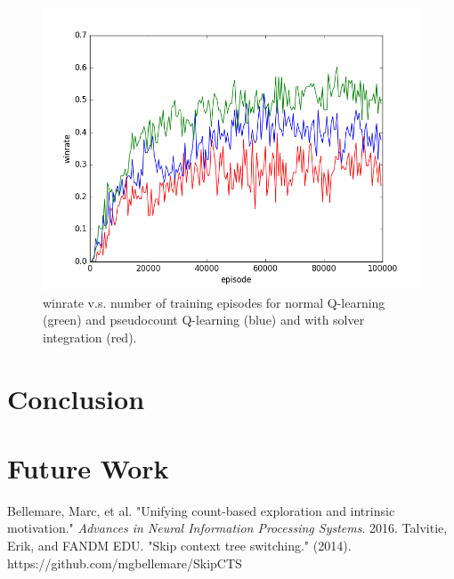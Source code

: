 \documentclass{article}
\begin{document}
\begin{figure}[!ht]
\centering
\includegraphics[width=1\textwidth]{pics/wolve_learning_curves.png}
\caption{winrate v.s. number of training episodes for normal Q-learning (green) and pseudocount Q-learning (blue) and with solver integration (red).}
\end{figure}

\section*{Conclusion}

\section*{Future Work}

\begin{thebibliography}{plain}
Bellemare, Marc, et al. "Unifying count-based exploration and intrinsic motivation." \textit{Advances in Neural Information Processing Systems}. 2016.
Talvitie, Erik, and FANDM EDU. "Skip context tree switching." (2014).
https://github.com/mgbellemare/SkipCTS
\end{thebibliography}
\end{document}
